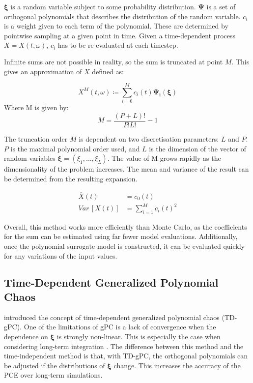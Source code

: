 \(\boldsymbol{\xi}\) is a random variable subject to some probability distribution. \({\boldsymbol{\Psi}}\) is a set of orthogonal polynomials that describes the
distribution of the random variable. \(c_i\) is a weight given to each term of the polynomial. These are determined by
pointwise sampling at a given point in time. Given a time-dependent process \(X = X(t, \omega)\), \(c_i\) has to be
re-evaluated at each timestep. 

Infinite sums are not possible in reality, so the sum is truncated at point \(M\). This gives an approximation of \(X\)
defined as:

\begin{equation}
\label{eq:gPC_truncated}
X^M(t, \omega) \coloneq \sum_{i = 0}^{M}c_i(t)\boldsymbol{\Psi_i}(\boldsymbol{\xi})
\end{equation}
Where M is given by:
\begin{equation}
\label{eq:gPC_truncation_order}
M = \frac{(P + L)!}{P!L!} - 1
\end{equation}

The truncation order \(M\) is dependent on two discretisation parameters: \(L\) and \(P\). \(P\) is the maximal polynomial order
used, and \(L\) is the dimension of the vector of random variables \(\boldsymbol{\xi} = (\xi_1, \dots, \xi_L)\). The value of M
grows rapidly as the dimensionality of the problem increases. The mean and variance of the result can be determined from
the resulting expansion. 

\begin{align}
    \overbar{X}(t) &= c_0(t) \\
    \mathit{Var} \, \left[ X(t) \right] &= \sum_{i = 1}^{M} c_i(t)^2
\end{align}

Overall, this method works more efficiently than Monte Carlo, as the coefficients for the sum can be estimated using far
fewer model evaluations. Additionally, once the polynomial surrogate model is constructed, it can be evaluated quickly
for any variations of the input values. 

\subsection{Time-Dependent Generalized Polynomial Chaos}
\label{subsec:TD-gPC}
\textcite{gerritsmaTimedependentGeneralizedPolynomial2010} introduced the concept of time-dependent generalized
polynomial chaos (TD-gPC). One of the limitations of gPC is a lack of convergence when the dependence on \(\boldsymbol{\xi}\) is
strongly non-linear. This is especially the case when considering long-term integration
\parencite{heuvelineHybridGeneralizedPolynomial2014}. The difference between this method and the time-independent method
is that, with TD-gPC, the orthogonal polynomials can be adjusted if the distributions of \( \boldsymbol{\xi} \) change.
This increases the accuracy of the PCE over long-term simulations. 


